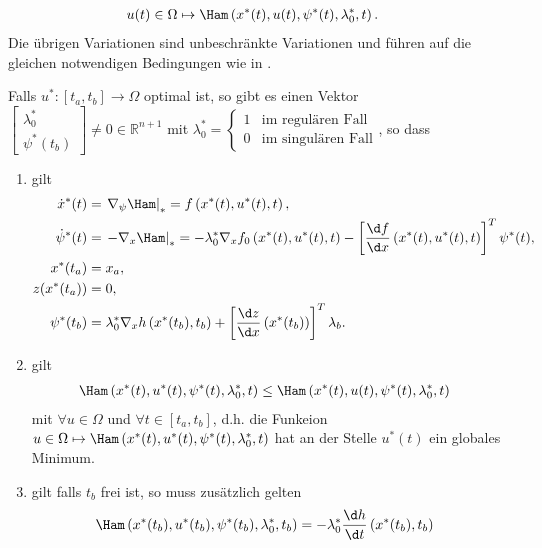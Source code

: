 \begin{align*}
	u(t)\in\Omega & \mapsto \Ham\left(x^{\ast}(t), u(t), \psi^{\ast}(t),\lambda_0^{\ast},t \right) .
\end{align*}
Die übrigen Variationen sind unbeschränkte Variationen und führen auf die gleichen notwendigen Bedingungen wie in .
\begin{satz}
Falls $u^{\ast}:[t_a,t_b]\rightarrow\Omega$ optimal ist, so gibt es einen Vektor $\begin{bmatrix}
\lambda_0^{\ast}\\ \psi^{\ast}(t_b)
\end{bmatrix}\neq 0\in\mathbb{R}^{n+1}$ mit $\lambda_0^{\ast}=\left\{\begin{array}{cl}
1 & \text{im regulären Fall}\\
0 & \text{im singulären Fall}
\end{array} \right.$, so dass
\begin{enumerate}[label=(\arabic*)]
  \item gilt
  \begin{align*}
  	\dot{x}^{\ast}(t) & = \left.\nabla_{\psi}\Ham\right|_{\ast} = f\left(x^{\ast}(t),u^{\ast}(t),t \right),\\
  	\dot{\psi}^{\ast}(t) & = \left.-\nabla_x\Ham\right|_{\ast}=-\lambda_0^{\ast}\nabla_xf_0\left(x^{\ast}(t),u^{\ast}(t),t \right)-\left[\frac{\d
  	f}{\d x}\left(x^{\ast}(t),u^{\ast}(t),t \right) \right]^T\psi^{\ast}(t),\\
  	x^{\ast}(t_a) & = x_a,\\
  	z(x^{\ast}(t_a)) & = 0,\\
  	\psi^{\ast}(t_b) & = \lambda_0^{\ast}\nabla_xh\left(x^{\ast}(t_b),t_b \right)+\left[\frac{\d z}{\d x}\left(x^{\ast}(t_b) \right)
  	\right]^T\lambda_b.
  \end{align*}
  \item gilt
  \begin{align}
  	\Ham\left(x^{\ast}(t),u^{\ast}(t),\psi^{\ast}(t),\lambda_0^{\ast},t \right) & \leq
  	\Ham\left(x^{\ast}(t),u(t),\psi^{\ast}(t),\lambda_0^{\ast},t \right)	\label{eqn:kap_2_Pontryagin_min}
  \end{align}
  mit $\forall u\in\Omega$ und $\forall t\in[t_a,t_b]$, d.h. die Funkeion
  $u\in\Omega\mapsto\Ham\left(x^{\ast}(t),u^{\ast}(t),\psi^{\ast}(t),\lambda_0^{\ast},t \right)$ hat an der Stelle $u^{\ast}(t)$ ein globales Minimum.
  \item gilt falls $t_b$ frei ist, so muss zusätzlich gelten
  \begin{align*}
  	\Ham\left(x^{\ast}(t_b),u^{\ast}(t_b),\psi^{\ast}(t_b),\lambda_0^{\ast},t_b \right) & = -\lambda_0^{\ast}\frac{\d h}{\d t}\left(x^{\ast}(t_b),t_b
  	\right)
  \end{align*}
\end{enumerate}
\end{satz}

